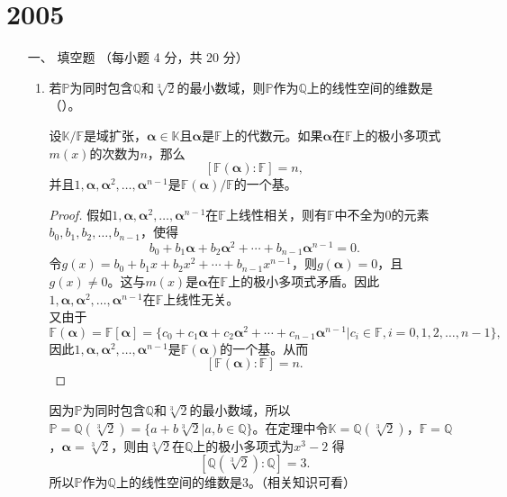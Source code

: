 \section{2005}
\begin{enumerate}[1~]
\renewcommand{\labelenumi}{\textbf{\theenumi. }}
\renewcommand{\Im}{\text{Im }}
\renewcommand{\u}{\boldsymbol{u}}
\item[一、]
填空题 （每小题 4 分，共 20 分）
\begin{enumerate}[1.~]
\item
若$\mathbb{P}$为同时包含$\mathbb{Q}$和$\sqrt[3]{2}$的最小数域，则$\mathbb{P}$作为$\mathbb{Q}$上的线性空间的维数是（\quad）。
\begin{solution}
\begin{theorem}
设$\mathbb{K}/\mathbb{F}$是域扩张，$\boldsymbol{\alpha} \in \mathbb{K}$且$\boldsymbol{\alpha}$是$\mathbb{F}$上的代数元。如果$\boldsymbol{\alpha}$在$\mathbb{F}$上的极小多项式$m(x)$的次数为$n$，那么\[
[\mathbb{F}(\boldsymbol{\alpha}):\mathbb{F}]=n,
\]
并且$1, \boldsymbol{\alpha}, \boldsymbol{\alpha}^2, \dots, \boldsymbol{\alpha}^{n-1}$是$\mathbb{F}(\boldsymbol{\alpha})/\mathbb{F}$的一个基。
\end{theorem}
\begin{proof}
假如$1, \boldsymbol{\alpha}, \boldsymbol{\alpha}^2, \dots, \boldsymbol{\alpha}^{n-1}$在$\mathbb{F}$上线性相关，则有$\mathbb{F}$中不全为0的元素$b_0, b_1, b_2, \dots, b_{n-1}$，使得\[
b_0+b_1\boldsymbol{\alpha}+b_2\boldsymbol{\alpha}^2+\cdots+b_{n-1}\boldsymbol{\alpha}^{n-1}=0.
\]
令$g(x)=b_0+b_1x+b_2x^2+\cdots+b_{n-1}x^{n-1}$，则$g(\boldsymbol{\alpha})=0$，且$g(x)\ne 0$。这与$m(x)$是$\boldsymbol{\alpha}$在$\mathbb{F}$上的极小多项式矛盾。因此$1, \boldsymbol{\alpha}, \boldsymbol{\alpha}^2, \dots, \boldsymbol{\alpha}^{n-1}$在$\mathbb{F}$上线性无关。\\
又由于\[
\mathbb{F}(\boldsymbol{\alpha})=\mathbb{F}[\boldsymbol{\alpha}]=\{c_0+c_1\boldsymbol{\alpha}+c_2\boldsymbol{\alpha}^2+\cdots+c_{n-1}\boldsymbol{\alpha}^{n-1}|c_i\in\mathbb{F}, i=0, 1, 2, \dots, n-1\},
\]
因此$1, \boldsymbol{\alpha}, \boldsymbol{\alpha}^2, \dots, \boldsymbol{\alpha}^{n-1}$是$\mathbb{F}(\boldsymbol{\alpha})$的一个基。从而\[
[\mathbb{F}(\boldsymbol{\alpha}):\mathbb{F}]=n.
\]
\end{proof}
因为$\mathbb{P}$为同时包含$\mathbb{Q}$和$\sqrt[3]{2}$的最小数域，所以$\mathbb{P}=\mathbb{Q}(\sqrt[3]{2})=\{a+b\sqrt[3]{2}|a, b\in\mathbb{Q}\}$。在定理中令$\mathbb{K}=\mathbb{Q}(\sqrt[3]{2})$，$\mathbb{F}=\mathbb{Q}$，$\boldsymbol{\alpha}=\sqrt[3]{2}$，则由$
\sqrt[3]{2}\text{在$\mathbb{Q}$上的极小多项式为}x^3-2
$
得\[
[\mathbb{Q}(\sqrt[3]{2}):\mathbb{Q}]=3.
\]
所以$\mathbb{P}$作为$\mathbb{Q}$上的线性空间的维数是3。（相关知识可看\cite{qiujin}）
\end{solution}


\end{enumerate}
\end{enumerate}
